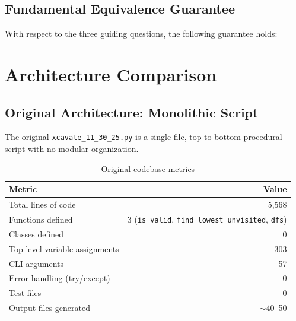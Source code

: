 \documentclass[11pt,a4paper]{article}
\newcommand{\original}{\texttt{xcavate\_11\_30\_25.py}}
\begin{document}
\subsection{Fundamental Equivalence Guarantee}

With respect to the three guiding questions, the following guarantee holds:

\begin{center}
\end{center}


\section{Architecture Comparison}

\subsection{Original Architecture: Monolithic Script}

The original \original{} is a single-file, top-to-bottom procedural script with no modular organization.

\begin{table}[H]
\centering
\caption{Original codebase metrics}
\begin{tabular}{lr}
\toprule
\textbf{Metric} & \textbf{Value} \\
\midrule
Total lines of code & 5,568 \\
Functions defined & 3 (\texttt{is\_valid}, \texttt{find\_lowest\_unvisited}, \texttt{dfs}) \\
Classes defined & 0 \\
Top-level variable assignments & 303 \\
CLI arguments & 57 \\
Error handling (try/except) & 0 \\
Test files & 0 \\
Output files generated & $\sim$40--50 \\
\bottomrule
\end{tabular}
\end{table}
\end{document}
